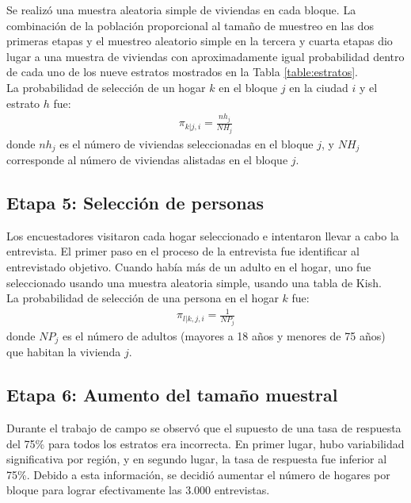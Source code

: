 \documentclass[12pt]{report}
\begin{document}
Se realizó una muestra aleatoria simple de viviendas en cada bloque. La combinación de la población proporcional al tamaño de muestreo en las dos primeras etapas y el muestreo aleatorio simple en la tercera y cuarta etapas dio lugar a una muestra de viviendas con aproximadamente igual probabilidad dentro de cada uno de los nueve estratos mostrados en la Tabla \ref{table:estratos}.\\

La probabilidad de selección de un hogar $k$ en el bloque $j$ en la ciudad $i$ y el estrato $h$ fue:
\begin{eqnarray*}
	\pi_{k|j,i} = \frac{nh_j}{NH_j}
\end{eqnarray*} 
donde $nh_j$ es el número de viviendas seleccionadas en el bloque $j$, y $NH_j$ corresponde al número de viviendas alistadas en el bloque $j$.\\


\subsection*{Etapa 5: Selección de personas}

Los encuestadores visitaron cada hogar seleccionado e intentaron llevar a cabo la entrevista. El primer paso en el proceso de la entrevista fue identificar al entrevistado objetivo. Cuando había más de un adulto en el hogar, uno fue seleccionado usando una muestra aleatoria simple, usando una tabla de Kish.\\

La probabilidad de selección de una persona en el hogar $k$ fue:
\begin{eqnarray*}
	\pi_{l|k,j,i} = \frac{1}{NP_j}
\end{eqnarray*} 
donde $NP_j$ es el número de adultos (mayores a 18 años y menores de 75 años) que habitan la vivienda $j$. \\

\subsection*{Etapa 6: Aumento del tamaño muestral}

Durante el trabajo de campo se observó que el supuesto de una tasa de respuesta del 75\% para todos los estratos era incorrecta. En primer lugar, hubo variabilidad significativa por región, y en segundo lugar, la tasa de respuesta fue inferior al 75\%. Debido a esta información, se decidió aumentar el número de hogares por bloque para lograr efectivamente las 3.000 entrevistas.\\
\end{document}
